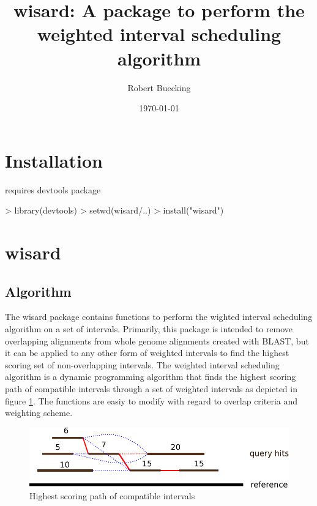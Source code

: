 \documentclass[letterpaper]{article}
\title{wisard: A package to perform the weighted interval scheduling algorithm}
\author{Robert Buecking}
\date{\today}
\begin{document}



\maketitle
\tableofcontents

\section{Installation}

requires devtools package
\begin{Schunk}
\begin{Sinput}
	> library(devtools)
	> setwd(wisard/..)
	> install("wisard")
\end{Sinput}
\end{Schunk}

\section{wisard}

\subsection{Algorithm}

The wisard package contains functions to perform the wighted interval scheduling
algorithm on a set of intervals. Primarily, this package is intended to remove
overlapping alignments from whole genome alignments created with BLAST, but it
can be applied to any other form of weighted intervals to find the highest
scoring set of non-overlapping intervals. The weighted interval scheduling
algorithm is a dynamic programming algorithm that finds the highest scoring
path of compatible intervals through a set of weighted intervals as depicted
in figure \ref{fig:algo}. The functions are easiy to modify with regard to
overlap criteria and weighting scheme.

\begin{figure}[h]
\includegraphics{algorithm.pdf}
\caption{Highest scoring path of compatible intervals}
\label{fig:algo}
\end{figure}
\end{document}
